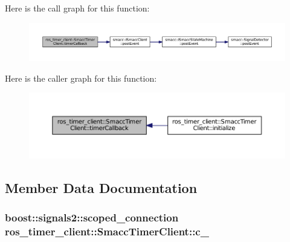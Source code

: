 Here is the call graph for this function\+:
\nopagebreak
\begin{figure}[H]
\begin{center}
\leavevmode
\includegraphics[width=350pt]{classros__timer__client_1_1SmaccTimerClient_ab6a461bedfad7a1842d27249008cae4d_cgraph}
\end{center}
\end{figure}




Here is the caller graph for this function\+:
\nopagebreak
\begin{figure}[H]
\begin{center}
\leavevmode
\includegraphics[width=350pt]{classros__timer__client_1_1SmaccTimerClient_ab6a461bedfad7a1842d27249008cae4d_icgraph}
\end{center}
\end{figure}




\subsection{Member Data Documentation}
\subsubsection[{\texorpdfstring{c\+\_\+}{c_}}]{\setlength{\rightskip}{0pt plus 5cm}boost\+::signals2\+::scoped\+\_\+connection ros\+\_\+timer\+\_\+client\+::\+Smacc\+Timer\+Client\+::c\+\_\+}\hypertarget{classros__timer__client_1_1SmaccTimerClient_a71473af935673138cb1f93a16c8fe37f}{}\label{classros__timer__client_1_1SmaccTimerClient_a71473af935673138cb1f93a16c8fe37f}


